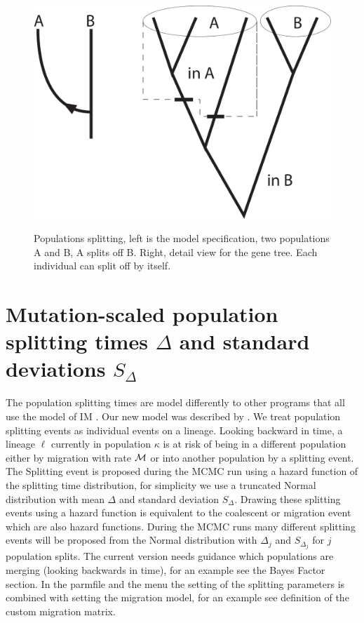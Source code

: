 


\begin{figure}[tbh]
\begin{center}
\leavevmode
\hbox{%
\includegraphics[scale=0.4]{mim/species_manual}}
\end{center}

\caption{Populations splitting, left is the model specification, two populations A and B, A splits off B. Right, detail view for the gene tree. Each individual can split off by itself.}
\label{FIG2}
\end{figure}

\section*{Mutation-scaled population splitting  times $\Delta$ and standard deviations $S_\Delta$}
The population splitting times are model differently to other programs that all use the model of IM \citep{Hey:2010a}.
Our new model was described by \cite{beerli2019b}.  We treat population splitting events as individual events on a lineage. Looking backward in time, a lineage $\ell$  currently in population $\kappa$ is at risk of being  in a different population either by migration with rate $\mathcal{M}$ or into another population by a splitting event. The Splitting event is proposed during the MCMC run using a hazard function of the splitting time distribution, for simplicity we use a truncated Normal distribution with mean $\Delta$ and standard deviation $S_\Delta$. Drawing these splitting events using a hazard function is equivalent to the coalescent or migration event which are also hazard functions. During the MCMC runs many different splitting events will be proposed from the Normal distribution with $\Delta_j$ and $S_{\Delta_j}$ for $j$ population splits. The current version needs guidance which populations are merging (looking backwards in time), for an example see the Bayes Factor section.  In the parmfile and the menu the setting of the splitting parameters is combined with setting the migration model, for an example see definition of the custom migration matrix.  


